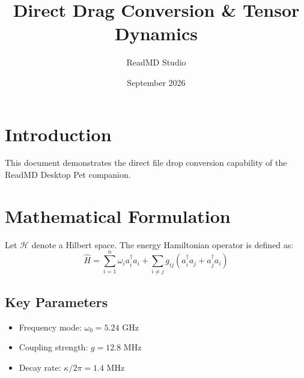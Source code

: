 \documentclass{article}
\title{Direct Drag Conversion & Tensor Dynamics}
\author{ReadMD Studio}
\date{September 2026}
\begin{document}
\maketitle

\section{Introduction}
This document demonstrates the direct file drop conversion capability of the ReadMD Desktop Pet companion.

\section{Mathematical Formulation}
Let $\mathcal{H}$ denote a Hilbert space. The energy Hamiltonian operator is defined as:
\begin{equation}
\hat{H} = \sum_{i=1}^{n} \omega_i a_i^\dagger a_i + \sum_{i \ne j} g_{ij} (a_i^\dagger a_j + a_j^\dagger a_i)
\end{equation}

\subsection{Key Parameters}
\begin{itemize}
  \item Frequency mode: $\omega_0 = 5.24\text{ GHz}$
  \item Coupling strength: $g = 12.8\text{ MHz}$
  \item Decay rate: $\kappa / 2\pi = 1.4\text{ MHz}$
\end{itemize}
\end{document}
